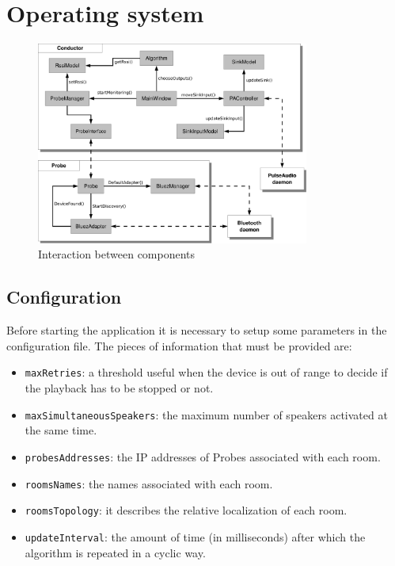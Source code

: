 \documentclass[conference]{IEEEtran}
\begin{document}

\section{Operating system}

\begin{figure}
\centering
\includegraphics[width=0.8\textwidth]{architettura}
\caption{Interaction between components}
\label{arch}
\end{figure}

\subsection{Configuration}
Before starting the application it is necessary to setup some parameters in the configuration file. The pieces of information that must be provided are:
\begin{itemize}
\item \texttt{maxRetries}: a threshold useful when the device is out of range to decide if the playback has to be stopped or not.
\item \texttt{maxSimultaneousSpeakers}: the maximum number of speakers activated at the same time.
\item \texttt{probesAddresses}: the IP addresses of Probes associated with each room.
\item \texttt{roomsNames}: the names associated with each room.
\item \texttt{roomsTopology}: it describes the relative localization of each room. %
\item \texttt{updateInterval}: the amount of time (in milliseconds) after which the algorithm is repeated in a cyclic way.
\end{itemize}
\end{document}
